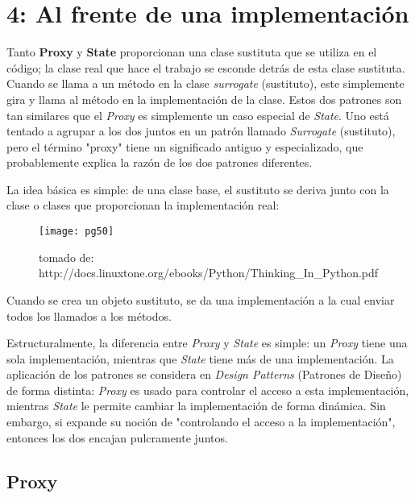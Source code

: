 \section*{4: Al frente de una implementación}
\label{sec:afdui}

Tanto \textbf{Proxy} y \textbf{State} proporcionan una clase sustituta que se utiliza en el código; la clase real que hace el trabajo se esconde detrás de esta clase sustituta. Cuando se llama a un método en la clase \textit{surrogate} (sustituto), este simplemente gira y llama al método en la implementación de la clase. Estos dos patrones son tan similares que el \textit{Proxy} es simplemente un caso especial de \textit{State}. Uno está tentado a agrupar a los dos juntos en un patrón llamado \textit{Surrogate} (sustituto), pero el término "proxy" tiene un significado antiguo y  especializado, que probablemente explica la razón de los dos patrones diferentes.    \newline

La idea básica es simple: de una clase base, el sustituto se deriva junto con la clase o clases que proporcionan la implementación real:

\begin{figure}[h]
    \centering
    \texttt{[image: pg50]} 
    \caption{tomado de: http://docs.linuxtone.org/ebooks/Python/Thinking\_In\_Python.pdf }
    \label{fig:mesh1}
\end{figure}

Cuando se crea un objeto sustituto, se da una implementación a la cual enviar todos los llamados a los métodos.    \newline

Estructuralmente, la diferencia entre \textit{Proxy} y \textit{State} es simple: un \textit{Proxy} tiene una sola implementación, mientras que \textit{State} tiene más de una implementación. La aplicación  de los patrones se considera en \textit{Design Patterns} (Patrones de Diseño) de forma distinta: \textit{Proxy} es usado para controlar el acceso a esta implementación, mientras \textit{State}  le permite cambiar la implementación de forma dinámica. Sin embargo, si expande su noción de "controlando el acceso a la implementación", entonces los dos encajan pulcramente juntos.

\subsection*{Proxy}
\label{subsec:Proxy}


